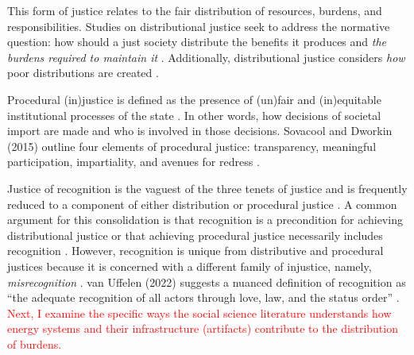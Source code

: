         
\noindent\hrulefill

        This form of justice relates to the fair distribution of resources, burdens, and
        responsibilities. Studies on distributional justice seek to address the normative
        question: how should a just society distribute the benefits it produces and \textit{the burdens required to maintain it} \cite{brighouse_justice_2004}. Additionally, distributional justice considers \textit{how} poor distributions are
        created \cite{schlosberg_2_2007}.
        
\noindent\hrulefill

        Procedural (in)justice is defined as the presence of (un)fair and (in)equitable
        institutional processes of the state \cite{schlosberg_2_2007}. In other words, 
        how decisions of societal import are made and who is involved in those
        decisions. Sovacool and Dworkin (2015) outline four elements of procedural
        justice: transparency, meaningful participation, impartiality, and avenues
        for redress \cite{sovacool_energy_2015}.
        
\noindent\hrulefill

        Justice of recognition is the vaguest of the three tenets of justice and is frequently reduced to a component of either distribution or procedural justice \cite{schlosberg_2_2007, van_uffelen_revisiting_2022}. A common argument for this consolidation is that recognition is a precondition for achieving distributional justice or that achieving procedural justice necessarily includes recognition \cite{schlosberg_2_2007}. However, recognition is unique from distributive and 
        procedural justices because it is concerned with a different family of injustice, 
        namely, \textit{misrecognition} \cite{van_uffelen_revisiting_2022}. van Uffelen (2022) suggests a nuanced definition of recognition as ``the adequate recognition
        of all actors through love, law, and the status order'' \cite{van_uffelen_revisiting_2022}.
    \textcolor{red}{Next, I examine the specific ways the social science literature understands how energy systems and their infrastructure (artifacts) contribute to the distribution of burdens.}
    

